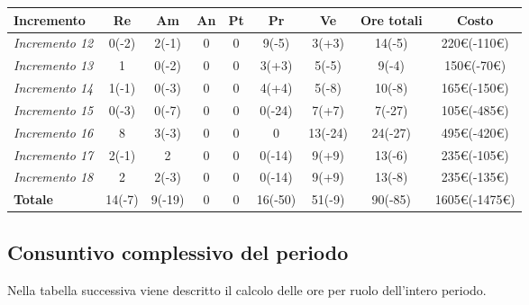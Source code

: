 {{{{{{{{{{{{{{{{{{{{	\begin{center}
		\renewcommand{\arraystretch}{1.4}
		\begin{tabularx}{\textwidth}{|X|c|c|c|c|c|c|c|c|}
			\hline
			\rowcolor{airforceblue}
			\textbf{Incremento} & \textbf{Re} & \textbf{Am} & \textbf{An} & \textbf{Pt} & \textbf{Pr} & \textbf{Ve} & \textbf{Ore totali} & \textbf{Costo} \\
			\hline
			\textit{Incremento 12} & 0(-2) & 2(-1) & 0 & 0 & 9(-5) & 3(+3) & 14(-5) & 220\euro(-110\euro) \\
			\hline
			\textit{Incremento 13} & 1 & 0(-2) & 0 & 0 & 3(+3) & 5(-5) & 9(-4) & 150\euro(-70\euro) \\
			\hline
			\textit{Incremento 14} & 1(-1) & 0(-3) & 0 & 0 & 4(+4) & 5(-8) & 10(-8) & 165\euro(-150\euro) \\
			\textit{Incremento 15} & 0(-3) & 0(-7) & 0 & 0 & 0(-24) & 7(+7) & 7(-27) & 105\euro(-485\euro) \\
			\textit{Incremento 16} & 8 & 3(-3) & 0 & 0 & 0 & 13(-24) & 24(-27) & 495\euro(-420\euro) \\
			\textit{Incremento 17} & 2(-1) & 2 & 0 & 0 & 0(-14) & 9(+9) & 13(-6) & 235\euro(-105\euro) \\
			\hline
			\textit{Incremento 18} & 2 & 2(-3) & 0 & 0 & 0(-14) & 9(+9) & 13(-8) & 235\euro(-135\euro) \\
			\hline
			\textbf{Totale} & 14(-7) & 9(-19) & 0 & 0 & 16(-50) & 51(-9) & 90(-85) & 1605\euro(-1475\euro) \\
			\hline
		\end{tabularx}
	\end{center}

\subsection{Consuntivo complessivo del periodo}

Nella tabella successiva viene descritto il calcolo delle ore per ruolo dell'intero periodo.

}}}}}}}}}}}}}}}}}}}}
